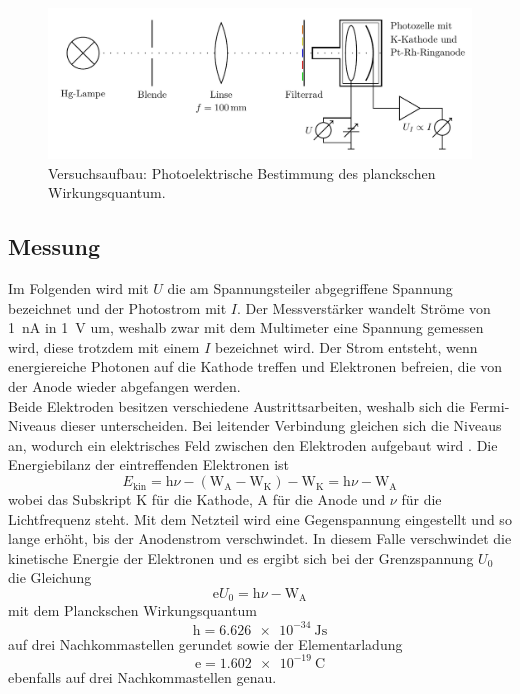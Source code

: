 \begin{figure}[htb]
	\centering
	\includegraphics[width=0.8\linewidth]{../figs/photozelle_optikbank}
	\caption{Versuchsaufbau: Photoelektrische Bestimmung des planckschen Wirkungsquantum.
	\cite[S.19]{skript}}
	\label{fig:photozelle_optikbank}
\end{figure}

\subsection{Messung}
Im Folgenden wird mit $U$ die am Spannungsteiler abgegriffene Spannung bezeichnet und der Photostrom
mit $I$. Der Messverstärker wandelt Ströme von \SI{1}{\nano\ampere} in \SI{1}{\volt} um,
weshalb zwar mit dem Multimeter eine Spannung gemessen wird, diese trotzdem mit einem $I$ bezeichnet
wird. Der Strom entsteht, wenn energiereiche Photonen auf die Kathode treffen und
Elektronen befreien, die von der Anode wieder abgefangen werden.\\
Beide Elektroden besitzen verschiedene Austrittsarbeiten, weshalb sich die Fermi-Niveaus
dieser unterscheiden. Bei leitender Verbindung gleichen sich die Niveaus an, wodurch
ein elektrisches Feld zwischen den Elektroden aufgebaut wird
\cite{wiki:kontaktpotential}. 
Die Energiebilanz der eintreffenden
Elektronen ist
\begin{equation}
	E_\mathrm{kin} = \mathrm h\nu - (\mathrm W_{\mathrm A} - \mathrm W_{\mathrm K})
	- \mathrm W_{\mathrm K} = \mathrm h\nu - \mathrm W_{\mathrm A}\nonumber
\end{equation}
wobei das Subskript K für die Kathode, A für die Anode und $\nu$ für die Lichtfrequenz steht.
Mit dem Netzteil wird eine Gegenspannung eingestellt und so lange erhöht, bis
der Anodenstrom verschwindet. In diesem Falle verschwindet die kinetische Energie der Elektronen
und es ergibt sich bei der Grenzspannung $U_0$ die Gleichung
\begin{equation}
	\mathrm eU_0 = \mathrm h\nu - \mathrm W_{\mathrm A}
	\label{eq:gegenfeldmethode}
\end{equation}
mit dem Planckschen Wirkungsquantum\cite[S.75]{Demtröder:829119} 
$$\mathrm h=\SI{6.626e-34}{\joule\second}$$ 
auf drei Nachkommastellen gerundet sowie der Elementarladung\cite[S.29]{Demtröder:829119}
\[\mathrm e = \SI{1.602e-19}{\coulomb}\]
ebenfalls auf drei Nachkommastellen genau.

